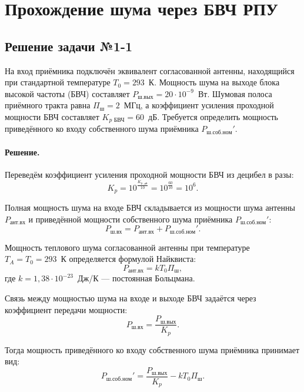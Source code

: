 \section{Прохождение шума через БВЧ РПУ}

\subsection{Решение задачи №1-1}

На вход приёмника подключён эквивалент согласованной антенны, находящийся при стандартной температуре $T_0 = 293$~К. Мощность шума на выходе блока высокой частоты (БВЧ) составляет $P_{\text{ш.вых}} = 20 \cdot 10^{-9}$~Вт. Шумовая полоса приёмного тракта равна $\Pi_{\text{ш}} = 2$~МГц, а коэффициент усиления проходной мощности БВЧ составляет $K_{p\text{ БВЧ}} = 60$~дБ.
Требуется определить мощность приведённого ко входу собственного шума приёмника $P_{\text{ш.соб.ном}}'$.

\paragraph{Решение.}
Переведём коэффициент усиления проходной мощности БВЧ из децибел в разы:
\begin{equation}
    K_p = 10^{\frac{K_{p\text{, дБ}}}{10}} = 10^{\frac{60}{10}} = 10^6.
\end{equation}

Полная мощность шума на входе БВЧ складывается из мощности шума антенны $P_{\text{ант.вх}}$ и приведённой мощности собственного шума приёмника $P_{\text{ш.соб.ном}}'$:
\begin{equation}
    P_{\text{ш.вх}} = P_{\text{ант.вх}} + P_{\text{ш.соб.ном}}'.
\end{equation}

Мощность теплового шума согласованной антенны при температуре $T_A = T_0 = 293$~К определяется формулой Найквиста:
\begin{equation}
    P_{\text{ант.вх}} = k T_0 \Pi_{\text{ш}},
\end{equation}
где $k = 1{,}38 \cdot 10^{-23}$~Дж/К — постоянная Больцмана.

Связь между мощностью шума на входе и выходе БВЧ задаётся через коэффициент передачи мощности:
\begin{equation}
    P_{\text{ш.вх}} = \frac{P_{\text{ш.вых}}}{K_p}.
\end{equation}

Тогда мощность приведённого ко входу собственного шума приёмника принимает вид:
\begin{equation}
    P_{\text{ш.соб.ном}}' = \frac{P_{\text{ш.вых}}}{K_p} - k T_0 \Pi_{\text{ш}}.
\end{equation}

